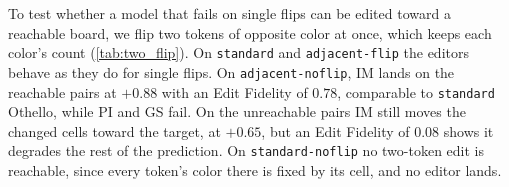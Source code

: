 \documentclass{article} %
\begin{document}
To test whether a model that fails on single flips can be edited toward a reachable board, we flip two tokens of opposite color at once, which keeps each color's count (\cref{tab:two_flip}). On \texttt{standard} and \texttt{adjacent-flip} the editors behave as they do for single flips. On \texttt{adjacent-noflip}, IM lands on the reachable pairs at $+0.88$ with an Edit Fidelity of $0.78$, comparable to \texttt{standard} Othello, while PI and GS fail. On the unreachable pairs IM still moves the changed cells toward the target, at $+0.65$, but an Edit Fidelity of $0.08$ shows it degrades the rest of the prediction. On \texttt{standard-noflip} no two-token edit is reachable, since every token's color there is fixed by its cell, and no editor lands.

\end{document}
